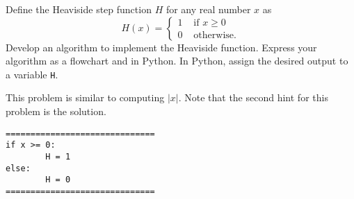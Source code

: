 \documentclass{ximera}
\begin{document}
\begin{question}
Define the Heaviside step function $H$ for any real number $x$ as
	$$H(x)=\begin{cases} 1 &\text{ if $x\geq 0$}\\
		0 &\text{ otherwise.}
	\end{cases}$$
Develop an algorithm to implement the Heaviside function. Express your algorithm as a flowchart and in Python. In Python, assign the desired output to a variable \verb|H|.
	\begin{hint}
		This problem is similar to computing $|x|$. Note that the second hint for this problem is the solution.
	\end{hint}
	\begin{hint}
	\begin{center}
	\end{center}
\begin{verbatim}
==============================
if x >= 0:
        H = 1
else:
        H = 0
==============================
\end{verbatim}
	\end{hint}
\end{question}
\end{document}
